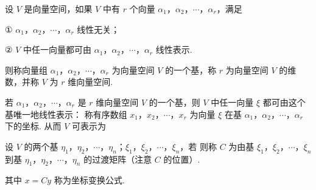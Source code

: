 


设 $V$ 是向量空间，如果 $V$ 中有 $r$ 个向量 $\alpha_1$，$\alpha_2$，$\cdots$，$\alpha_r$，满足

① $\alpha_1$，$\alpha_2$，$\cdots$，$\alpha_r$ 线性无关；

② $V$ 中任一向量都可由 $\alpha_1$，$\alpha_2$，$\cdots$，$\alpha_r$ 线性表示.

则称向量组 $\alpha_1$，$\alpha_2$，$\cdots$，$\alpha_r$ 为向量空间 $V$ 的一个基，称 $r$ 为向量空间 $V$ 的维数，并称 $V$ 为 $r$ 维向量空间.

若 $\alpha_1$，$\alpha_2$，$\cdots$，$\alpha_r$ 是 $r$ 维向量空间 $V$ 的一个基，则 $V$ 中任一向量 $\xi$ 都可由这个基唯一地线性表示：
称有序数组 $x_1$，$x_2$，$\cdots$，$x_r$ 为向量 $\xi$ 在基 $\alpha_1$，$\alpha_2$，$\cdots$，$\alpha_r$ 下的坐标. 从而 $V$ 可表示为



设 $V$ 的两个基 $\eta_1$，$\eta_2$，$\cdots$，$\eta_n$；$\xi_1$，$\xi_2$，$\cdots$，$\xi_n$，若
则称 $C$ 为由基 $\xi_1$，$\xi_2$，$\cdots$，$\xi_n$ 到基 $\eta_1$，$\eta_2$，$\cdots$，$\eta_n$ 的过渡矩阵（注意 $C$ 的位置）.





其中 $x=Cy$ 称为坐标变换公式.

